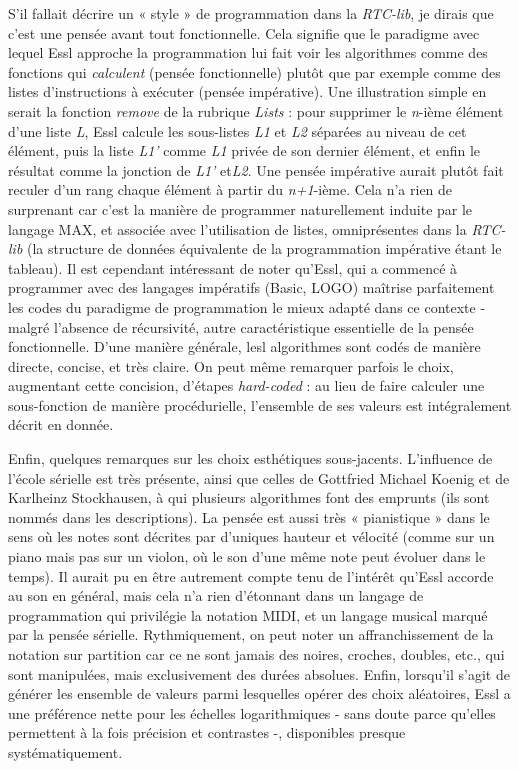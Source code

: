 \documentclass[a4paper,12pt]{article}
\begin{document}
S'il fallait décrire un « style » de programmation dans la \emph{RTC-lib}, je dirais que c'est une pensée avant tout fonctionnelle. Cela signifie que le paradigme avec lequel Essl approche la programmation lui fait voir les algorithmes comme des fonctions qui \emph{calculent} (pensée fonctionnelle) plutôt que par exemple comme des listes d'instructions à exécuter (pensée impérative). Une illustration simple en serait la fonction \emph{remove} de la rubrique \emph{Lists} : pour supprimer le \emph{n}-ième élément d'une liste \emph{L}, Essl calcule les sous-listes \emph{L1} et \emph{L2} séparées au niveau de cet élément, puis la liste \emph{L1'} comme \emph{L1} privée de son dernier élément, et enfin le résultat comme la jonction de \emph{L1'} et\emph{L2}. Une pensée impérative aurait plutôt fait reculer d'un rang chaque élément à partir du \emph{n+1}-ième. Cela n'a rien de surprenant car c'est la manière de programmer naturellement induite par le langage MAX, et associée avec l'utilisation de listes, omniprésentes dans la \emph{RTC-lib} (la structure de données équivalente de la programmation impérative étant le tableau). Il est cependant intéressant de noter qu'Essl, qui a commencé à programmer avec des langages impératifs (Basic, LOGO) maîtrise parfaitement les codes du paradigme de programmation le mieux adapté dans ce contexte - malgré l'absence de récursivité, autre caractéristique essentielle de la pensée fonctionnelle. D'une manière générale, lesl algorithmes sont codés de manière directe, concise, et très claire. On peut même remarquer parfois le choix, augmentant cette concision, d'étapes \emph{hard-coded} : au lieu de faire calculer une sous-fonction de manière procédurielle, l'ensemble de ses valeurs est intégralement décrit en donnée.

Enfin, quelques remarques sur les choix esthétiques sous-jacents. L'influence de l'école sérielle est très présente, ainsi que celles de Gottfried Michael Koenig et de Karlheinz Stockhausen, à qui plusieurs algorithmes font des emprunts (ils sont nommés dans les descriptions). La pensée est aussi très « pianistique » dans le sens où les notes sont décrites par d'uniques hauteur et vélocité (comme sur un piano mais pas sur un violon, où le son d'une même note peut évoluer dans le temps). Il aurait pu en être autrement compte tenu de l'intérêt qu'Essl accorde au son en général, mais cela n'a rien d'étonnant dans un langage de programmation qui privilégie la notation MIDI, et un langage musical marqué par la pensée sérielle. Rythmiquement, on peut noter un affranchissement de la notation sur partition car ce ne sont jamais des noires, croches, doubles, etc., qui sont manipulées, mais exclusivement des durées absolues. Enfin, lorsqu'il s'agit de générer les ensemble de valeurs parmi lesquelles opérer des choix aléatoires, Essl a une préférence nette pour les échelles logarithmiques - sans doute parce qu'elles permettent à la fois précision et contrastes -, disponibles presque systématiquement.
\end{document}
